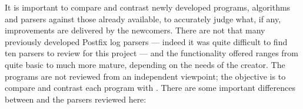 %

It is important to compare and contrast newly developed programs,
algorithms and parsers against those already available, to accurately judge
what, if any, improvements are delivered by the newcomers.  There are not
that many previously developed Postfix log parsers --- indeed it was quite
difficult to find ten parsers to review for this project --- and the
functionality offered ranges from quite basic to much more mature,
depending on the needs of the creator.  The programs are not reviewed from
an independent viewpoint; the objective is to compare and contrast each
program with \parsername{}.  There are some important differences between
\parsername{} and the parsers reviewed here:

